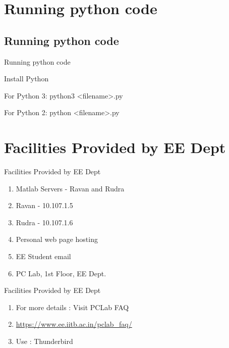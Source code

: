 \documentclass{beamer}
\newcounter{saveenumi}
\newcommand{\seti}{\setcounter{saveenumi}{\value{enumi}}}
\newcommand{\conti}{\setcounter{enumi}{\value{saveenumi}}}
\begin{document}
\section{Running python code}
{
	\subsection{Running python code}
	\begin{frame}{Running python code}
		\item<2-> Install Python
		\item<3-> For Python 3: python3 <filename>.py
		\item<3-> For Python 2: python <filename>.py
	\end{frame}		
}

\section{Facilities Provided by EE Dept}
{
\begin{frame}{Facilities Provided by EE Dept}
	\begin{enumerate}
		\item<2-> Matlab Servers - Ravan and Rudra
		\item<2-> Ravan - 10.107.1.5
		\item<2-> Rudra - 10.107.1.6
		\item<3-> Personal web page hosting								\item<4-> EE Student email
		\item<5-> PC Lab, 1st Floor, EE Dept.
		\seti
	\end{enumerate}
\end{frame}

\begin{frame}{Facilities Provided by EE Dept}
	\begin{enumerate}
		\conti
		\item<2-> For more details : Visit PCLab FAQ
		\item<2-> \url{https://www.ee.iitb.ac.in/pclab_faq/}
		\item<3-> Use : Thunderbird
	\end{enumerate}
\end{frame}
}
\end{document}
